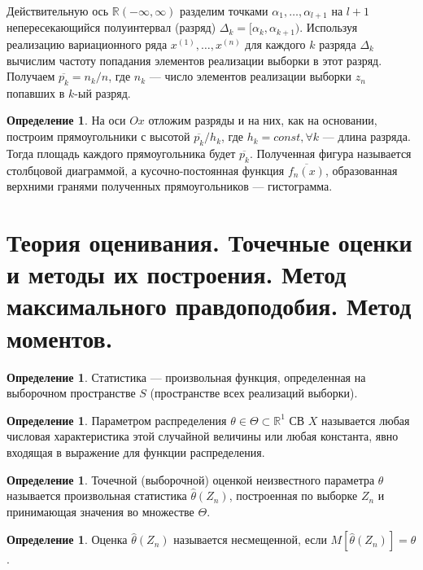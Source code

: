 \documentclass[12pt]{report}
\theoremstyle{definition}
\newtheorem{definition}[theorem]{Определение}
\newcommand{\R}{\mathbb R}
\begin{document}
Действительную ось $\R(-\infty, \infty)$ разделим точками
$\alpha_1, \dots, \alpha_{l+1}$ на $l+1$ непересекающийся полуинтервал
(разряд) $\Delta_k = [\alpha_k, \alpha_{k+1})$. Используя реализацию
вариационного ряда $x^{(1)}, \dots, x^{(n)}$ для каждого $k$ разряда
$\Delta_k$ вычислим частоту попадания элементов реализации выборки в
этот разряд.
Получаем $\overline{p_k} = n_k / n$, где $n_k$ --- число элементов
реализации выборки $z_n$ попавших в $k$-ый разряд.

\begin{definition}
На оси $Ox$ отложим разряды и на них, как на основании, построим прямоугольники
с высотой $\overline{p_k} / h_k$, где $h_k = const, \forall k$ --- длина разряда.
Тогда площадь каждого прямоугольника будет $\overline{p_k}$. Полученная фигура
называется столбцовой диаграммой, а кусочно-постоянная функция $\overline{f_n(x)}$,
образованная верхними гранями полученных прямоугольников --- гистограмма.
\end{definition}



\section
{
  Теория оценивания. Точечные оценки и методы их построения.
  Метод максимального правдоподобия. Метод моментов.
}

\begin{definition}
Статистика --- произвольная функция, определенная на выборочном
пространстве $S$ (пространстве всех реализаций выборки).
\end{definition}

\begin{definition}
Параметром распределения $\theta \in \Theta \subset \R^1$ СВ $X$
называется любая числовая характеристика этой случайной величины
или любая константа, явно входящая в выражение для функции распределения. 
\end{definition}

\begin{definition}
Точечной (выборочной) оценкой неизвестного параметра $\theta$ называется
произвольная статистика $\hat{\theta}(Z_n)$, построенная по выборке $Z_n$
и принимающая значения во множестве $\Theta$.
\end{definition}

\begin{definition}
Оценка $\hat{\theta}(Z_n)$ называется несмещенной, если $M[\hat{\theta}(Z_n)] = \theta$.
\end{definition}
\end{document}
